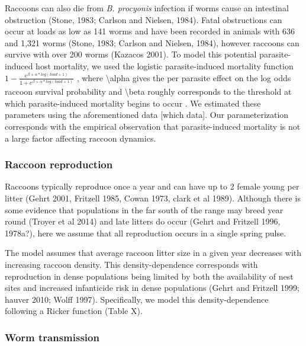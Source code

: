 \documentclass[11pt]{article}
\begin{document}
Raccoons can also die from \emph{B. procyonis} infection if worms cause
an intestinal obstruction (Stone, 1983; Carlson and Nielsen, 1984).
Fatal obstructions can occur at loads as low as 141 worms and have been
recorded in animals with 636 and 1,321 worms (Stone, 1983; Carlson and
Nielsen, 1984), however raccoons can survive with over 200 worms
(Kazacos 2001). To model this potential parasite-induced host mortality,
we used the logistic parasite-induced mortality function
\(1 - \frac{e^{\beta + \alpha*log(load + 1)}}{1 + e^{\beta + \alpha*log(load + 1)}}\)
, where \textbackslash{}alpha gives the per parasite effect on the log
odds raccoon survival probability and \textbackslash{}beta roughly
corresponds to the threshold at which parasite-induced mortality begins
to occur \citep{Wilber2016}. We estimated these parameters using the aforementioned data [which data]. Our parameterization corresponds with the empirical observation that parasite-induced mortality is not a large factor affecting raccoon dynamics.

\subsubsection{Raccoon reproduction}

Raccoons typically reproduce once a year and can have up to 2 female
young per litter (Gehrt 2001, Fritzell 1985, Cowan 1973, clark et al
1989). Although there is some evidence that populations in the far south
of the range may breed year round (Troyer et al 2014) and late litters
do occur (Gehrt and Fritzell 1996, 1978a?), here we assume that all
reproduction occurs in a single spring pulse.

The model assumes that average raccoon litter size in a given year
decreases with increasing raccoon density. This density-dependence
corresponds with reproduction in dense populations being limited by both
the availability of nest sites and increased infanticide risk in dense
populations (Gehrt and Fritzell 1999; hauver 2010; Wolff 1997).
Specifically, we model this density-dependence following a Ricker
function (Table X).

\subsubsection{Worm transmission}
\end{document}
